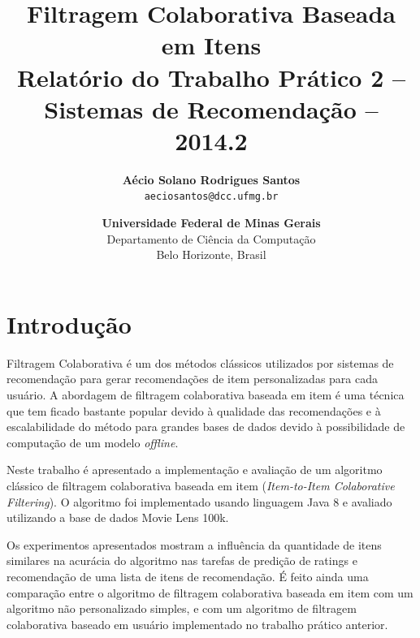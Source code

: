 \documentclass[12pt, a4paper, oneside]{article}
\begin{document}
\title{\textbf{Filtragem Colaborativa Baseada em Itens}\\
	\normalsize{Relatório do Trabalho Prático 2 -- Sistemas de Recomendação -- 2014.2}
}

\author{
    \textbf{Aécio Solano Rodrigues Santos}\\ 
    \small{\texttt{aeciosantos@dcc.ufmg.br}}\\
    \and
    \textbf{\small{Universidade Federal de Minas Gerais}}\\
    \small{Departamento de Ciência da Computação}\\
    \small{Belo Horizonte, Brasil}
}

\date{}

\maketitle



\section{Introdução}
\label{sec:introducao}

Filtragem Colaborativa é um dos métodos clássicos utilizados por sistemas de recomendação para gerar recomendações de item personalizadas para cada usuário.
A abordagem de filtragem colaborativa baseada em item é uma técnica que tem ficado bastante popular devido à qualidade das recomendações e à escalabilidade do método para grandes bases de dados devido à possibilidade de computação de um modelo \textit{offline}.

Neste trabalho é apresentado a implementação e avaliaç\~ao de um algoritmo clássico de filtragem colaborativa baseada em item (\textit{Item-to-Item Colaborative Filtering}). O algoritmo foi implementado usando linguagem Java 8 e avaliado utilizando a base de dados Movie Lens 100k.

Os experimentos apresentados mostram a influência da quantidade de itens similares na acurácia do algoritmo nas tarefas de predição de ratings e recomendação de uma lista de itens de recomendação. É feito ainda uma comparação entre o algoritmo de filtragem colaborativa baseada em item com um algoritmo não personalizado simples, e com um algoritmo de filtragem colaborativa baseado em usuário implementado no trabalho prático anterior.
\end{document}
